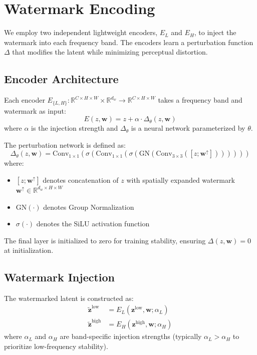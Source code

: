 \documentclass[11pt]{article}
\begin{document}
\section{Watermark Encoding}

We employ two independent lightweight encoders, $E_L$ and $E_H$, to inject the watermark into each frequency band. The encoders learn a perturbation function $\Delta$ that modifies the latent while minimizing perceptual distortion.

\subsection{Encoder Architecture}

Each encoder $E_{\{L,H\}}: \mathbb{R}^{C \times H \times W} \times \mathbb{R}^{d_w} \rightarrow \mathbb{R}^{C \times H \times W}$ takes a frequency band and watermark as input:
\begin{equation}
    E(z, \mathbf{w}) = z + \alpha \cdot \Delta_\theta(z, \mathbf{w})
\end{equation}
where $\alpha$ is the injection strength and $\Delta_\theta$ is a neural network parameterized by $\theta$.

The perturbation network is defined as:
\begin{equation}
    \Delta_\theta(z, \mathbf{w}) = \text{Conv}_{1 \times 1}\left(\sigma\left(\text{Conv}_{1 \times 1}\left(\sigma\left(\text{GN}\left(\text{Conv}_{3 \times 3}([z; \mathbf{w}^{\uparrow}])\right)\right)\right)\right)\right)
\end{equation}
where:
\begin{itemize}
    \item $[z; \mathbf{w}^{\uparrow}]$ denotes concatenation of $z$ with spatially expanded watermark $\mathbf{w}^{\uparrow} \in \mathbb{R}^{d_w \times H \times W}$
    \item $\text{GN}(\cdot)$ denotes Group Normalization
    \item $\sigma(\cdot)$ denotes the SiLU activation function
\end{itemize}

The final layer is initialized to zero for training stability, ensuring $\Delta(z, \mathbf{w}) = 0$ at initialization.

\subsection{Watermark Injection}

The watermarked latent is constructed as:
\begin{align}
    \tilde{\mathbf{z}}^{\text{low}} &= E_L(\mathbf{z}^{\text{low}}, \mathbf{w}; \alpha_L) \\
    \tilde{\mathbf{z}}^{\text{high}} &= E_H(\mathbf{z}^{\text{high}}, \mathbf{w}; \alpha_H)
\end{align}
where $\alpha_L$ and $\alpha_H$ are band-specific injection strengths (typically $\alpha_L > \alpha_H$ to prioritize low-frequency stability).
\end{document}
